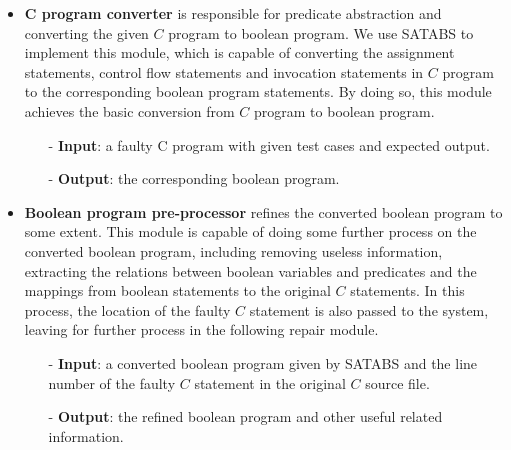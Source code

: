 \begin{itemize}
\item \textbf{C program converter} is responsible for predicate abstraction and converting the given $C$ program to boolean program.
We use SATABS\cite{SATABS} to implement this module, which is capable of converting the assignment statements, control flow statements and invocation statements in $C$ program to the corresponding boolean program statements. By doing so, this module achieves the basic conversion from $C$ program to boolean program.

\begin{itemize}
\item[-] \textbf{Input}: a faulty C program with given test cases and expected output.
\item[-] \textbf{Output}: the corresponding boolean program.
\end{itemize}

\item \textbf{Boolean program pre-processor} refines the converted boolean program to some extent. This module is capable of doing some further process on the converted boolean program,
including removing useless information, extracting the relations between boolean variables and predicates and the mappings from boolean statements to the original $C$ statements.
In this process, the location of the faulty $C$ statement is also passed to the system, leaving for further process in the following repair module.

\begin{itemize}
\item[-] \textbf{Input}: a converted boolean program given by SATABS and the line number of the faulty $C$ statement in the original $C$ source file.
\item[-] \textbf{Output}: the refined boolean program and other useful related information.
\end{itemize}


\end{itemize}
